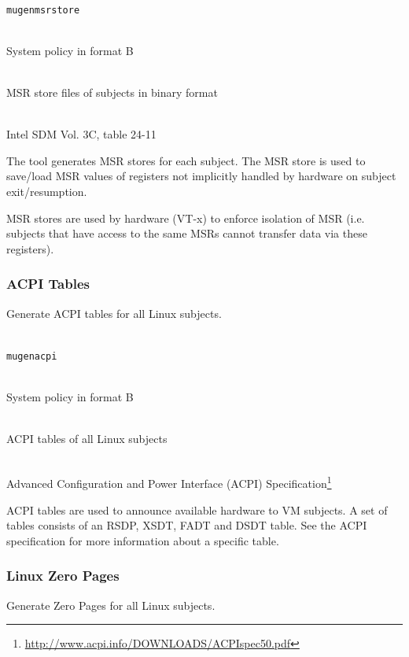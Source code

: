 \documentclass[a4paper,twoside,titlepage]{article}
\begin{document}
\begin{description} \itemsep1pt \parskip0pt
	\item[Name] \hfill \\
		\texttt{mugenmsrstore}
	\item[Input] \hfill \\
		System policy in format B
	\item[Output] \hfill \\
		MSR store files of subjects in binary format
	\item[Output format] \hfill \\
		Intel SDM Vol. 3C, table 24-11
\end{description}

The tool generates MSR stores for each subject. The MSR store is used to
save/load MSR values of registers not implicitly handled by hardware on subject
exit/resumption.

MSR stores are used by hardware (VT-x) to enforce isolation of MSR (i.e.
subjects that have access to the same MSRs cannot transfer data via these
registers).

\subsubsection{ACPI Tables}
Generate ACPI tables for all Linux subjects.

\begin{description} \itemsep1pt \parskip0pt
	\item[Name] \hfill \\
		\texttt{mugenacpi}
	\item[Input] \hfill \\
		System policy in format B
	\item[Output] \hfill \\
		ACPI tables of all Linux subjects
	\item[Output format] \hfill \\
		Advanced Configuration and Power Interface (ACPI)
		Specification\footnote{\url{http://www.acpi.info/DOWNLOADS/ACPIspec50.pdf}}
\end{description}

ACPI tables are used to announce available hardware to VM subjects. A set of
tables consists of an RSDP, XSDT, FADT and DSDT table. See the ACPI
specification for more information about a specific table.

\subsubsection{Linux Zero Pages}
Generate Zero Pages for all Linux subjects.
\end{document}
